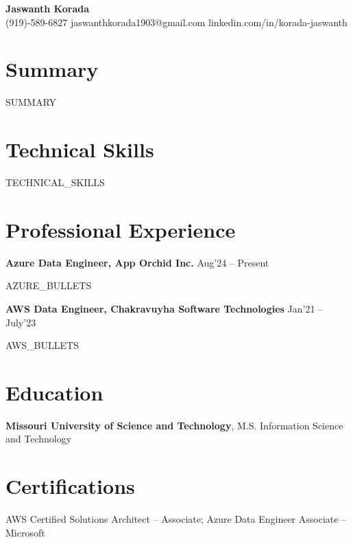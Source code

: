 \documentclass[9pt,letterpaper]{article}
\begin{document}
\begin{center}
{\Large \textbf{Jaswanth Korada}}\\[-1pt]
(919)-589-6827 \quad jaswanthkorada1903@gmail.com \quad linkedin.com/in/korada-jaswanth
\end{center}
\vspace{-6pt}

\section*{Summary}
{{SUMMARY}}

\section*{Technical Skills}
{{TECHNICAL_SKILLS}}

\section*{Professional Experience}
\textbf{Azure Data Engineer, App Orchid Inc.} \hfill Aug'24 -- Present
\begin{itemize}
{{AZURE_BULLETS}}
\end{itemize}
\textbf{AWS Data Engineer, Chakravuyha Software Technologies} \hfill Jan'21 -- July'23
\begin{itemize}
{{AWS_BULLETS}}
\end{itemize}

\section*{Education}
\textbf{Missouri University of Science and Technology}, M.S. Information Science and Technology

\section*{Certifications}
AWS Certified Solutions Architect -- Associate; Azure Data Engineer Associate -- Microsoft
\end{document}
